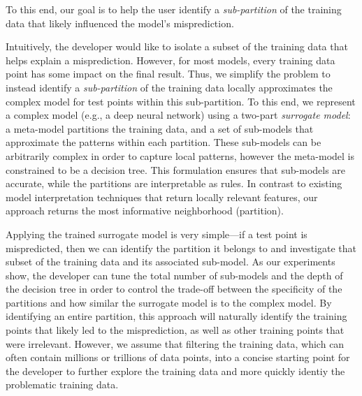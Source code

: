 

To this end, our goal is to help the user identify a {\it sub-partition} of the training data that likely influenced the model's misprediction.    

Intuitively, the developer would like to isolate a subset of the training data that helps explain a misprediction. 
However, for most models, every training data point has some impact on the final result.
Thus, we simplify the problem to instead identify a {\it sub-partition} of the training data locally approximates the complex model for test points within this sub-partition.  
To this end, we represent a complex model (e.g., a deep neural network) using a two-part {\it surrogate model}: a meta-model partitions the training data, and a set of sub-models that approximate the patterns within each partition.
These sub-models can be arbitrarily complex in order to capture local patterns, however the meta-model is constrained to be a decision tree.
This formulation ensures that sub-models are accurate, while the partitions are interpretable as rules.
In contrast to existing model interpretation techniques that return locally relevant features, our approach returns the most informative neighborhood (partition).

Applying the trained surrogate model is very simple---if a test point is mispredicted, then we can identify the partition it belongs to and investigate that subset of the training data and its associated sub-model.
As our experiments show, the developer can tune the total number of sub-models and the depth of the decision tree in order to control the trade-off between the specificity of the partitions and how similar the surrogate model is to the complex model.
By identifying an entire partition, this approach will naturally identify the training points that likely led to the misprediction, as well as other training points that were irrelevant.   However, we assume that filtering the training data, which can often contain millions or trillions of data points, into a concise starting point for the developer to further explore the training data and more quickly identiy the problematic training data.

